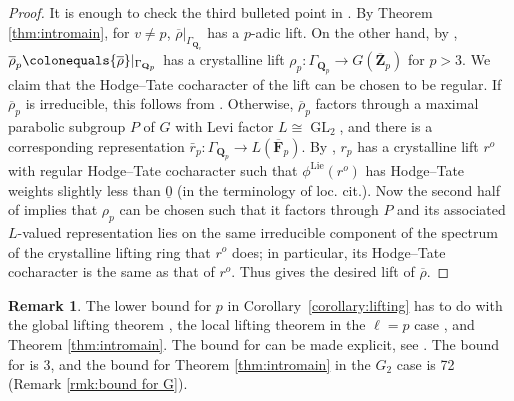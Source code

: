 \documentclass[11pt, letterpaper,english]{amsart}
\theoremstyle{plain}
\theoremstyle{definition}
\newtheorem{remark}[lem]{Remark}
\numberwithin{equation}{section}
\numberwithin{lem}{section}
\newcommand{\mathfont}{\mathbf}
\newcommand{\QQ}{\mathfont Q}
\newcommand{\FF}{\mathfont F}
\newcommand{\Fbar}{\overline{\FF}}
\newcommand{\Fpbar}{\Fbar_p}
\newcommand{\Zpbar}{\overline{\mathfont{Z}}_p}
\newcommand{\rhobar}{{\overline{\rho}}}
\newcommand{\gma}[1]{\Gamma_{#1}}
\DeclareMathOperator{\Lie}{Lie}
\DeclareMathOperator{\GL}{GL}
\begin{document}
\begin{proof}
It is enough to check the third bulleted point in \cite[Theorem A]{fkp21}. By Theorem \ref{thm:intromain}, for $v \neq p$, $\rhobar|_{\gma{\QQ_v}}$ has a $p$-adic lift. On the other hand, by \cite[Theorem C]{lin_g2}, $\rhobar_p \colonequals \rhobar|_{\gma{\QQ_p}}$ has a crystalline lift $\rho_p \colon \gma{\QQ_p} \to G(\Zpbar)$ for $p>3$. We claim that the Hodge--Tate cocharacter of the lift can be chosen to be regular. If $\rhobar_p$ is irreducible, this follows from \cite[Theorem 2]{lin2020}. Otherwise, $\rhobar_p$ factors through a maximal parabolic subgroup $P$ of $G$ with Levi factor $L \cong \GL_2$, and there is a corresponding representation $\bar r_p \colon \gma{\QQ_p} \to L(\Fpbar)$. By \cite[\S 7.2.1-7.2.2]{lin_g2}, $r_p$ has a crystalline lift $r^o$ with regular Hodge--Tate cocharacter such that $\phi^{\Lie}(r^o)$ has Hodge--Tate weights slightly less than $\underline{0}$ (in the terminology of loc. cit.). Now the second half of \cite[Theorem C]{lin_g2} implies that $\rho_p$ can be chosen such that it factors through $P$ and its associated $L$-valued representation lies on the same irreducible component of the spectrum of the crystalline lifting ring that $r^o$ does; in particular, its Hodge--Tate cocharacter is the same as that of $r^o$. Thus \cite[Theorem A]{fkp21} gives the desired lift of $\rhobar$.
\end{proof}

\begin{remark}
The lower bound for $p$ in Corollary~\ref{corollary:lifting} has to do with the global lifting theorem \cite[Theorem A]{fkp21}, the local lifting theorem in the $\ell=p$ case \cite[Theorem C]{lin_g2}, and Theorem \ref{thm:intromain}. The bound for \cite[Theorem A]{fkp21} can be made explicit, see \cite[Remark 6.17]{fkp21}. The bound for \cite[Theorem C]{lin_g2} is 3, and the bound for Theorem \ref{thm:intromain} in the $G_2$ case is 72 (Remark \ref{rmk:bound for G}).  
\end{remark}




\end{document}
